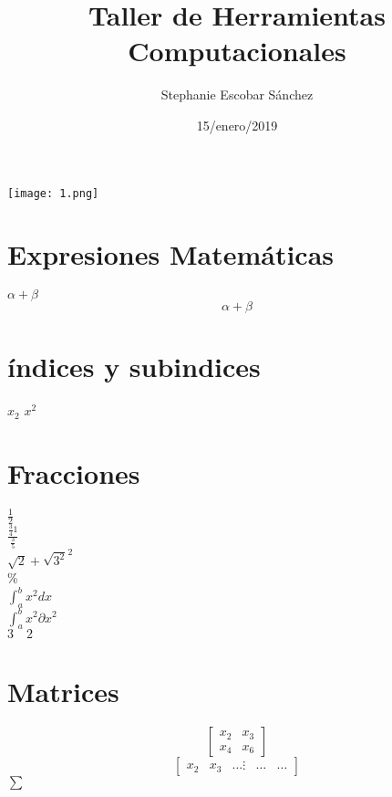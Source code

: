 \documentclass{article}
\title{\Huge Taller de Herramientas Computacionales}
\author{Stephanie Escobar Sánchez}
\date{15/enero/2019}
\begin{document}
	\maketitle
\begin{center}
	\texttt{[image: 1.png]}	
\end{center}
\newpage

\section*{Expresiones Matemáticas}
$\alpha + \beta$ %
\[\alpha + \beta\]
\section*{índices y subindices}
$x_{2}$
$x^{2}$\\
\section*{Fracciones}
$\frac{1}{2}$\\
$\frac{\frac{3}{4}1}{\frac{3}{5}}$\\
$\sqrt{2} + \sqrt{3^2}^2$\\
\%\\ %
$\int_{a}^{b} x^2 dx$\\
$\int_{a}^{b} x^2 \partial x^2$\\
$3 \quad 2$
\section{Matrices}
\[
\begin{bmatrix}
x_{2} & x_3\\
x_{4} & x_6	
\end{bmatrix}
\] %
\[
\begin{bmatrix}
x_{2} & x_{3} & \dots
\vdots & \dots & \dots

\end{bmatrix}
\]
$\sum$
\end{document}
